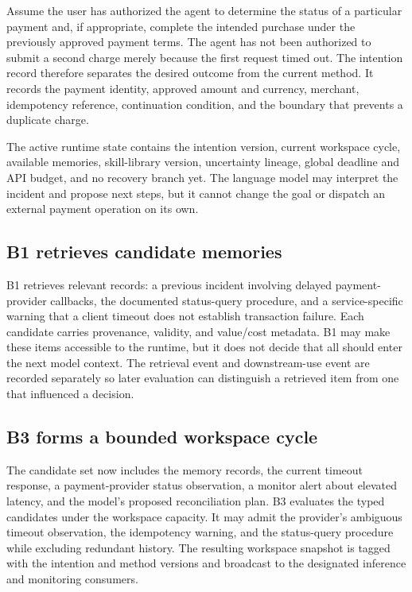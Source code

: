 Assume the user has authorized the agent to determine the status of a particular payment and, if appropriate, complete the intended purchase under the previously approved payment terms. The agent has not been authorized to submit a second charge merely because the first request timed out. The intention record therefore separates the desired outcome from the current method. It records the payment identity, approved amount and currency, merchant, idempotency reference, continuation condition, and the boundary that prevents a duplicate charge.

The active runtime state contains the intention version, current workspace cycle, available memories, skill-library version, uncertainty lineage, global deadline and API budget, and no recovery branch yet. The language model may interpret the incident and propose next steps, but it cannot change the goal or dispatch an external payment operation on its own.

\subsection{B1 retrieves candidate memories}
\label{subsec:ch18-productx-b1}

B1 retrieves relevant records: a previous incident involving delayed payment-provider callbacks, the documented status-query procedure, and a service-specific warning that a client timeout does not establish transaction failure. Each candidate carries provenance, validity, and value/cost metadata. B1 may make these items accessible to the runtime, but it does not decide that all should enter the next model context. The retrieval event and downstream-use event are recorded separately so later evaluation can distinguish a retrieved item from one that influenced a decision.

\subsection{B3 forms a bounded workspace cycle}
\label{subsec:ch18-productx-b3}

The candidate set now includes the memory records, the current timeout response, a payment-provider status observation, a monitor alert about elevated latency, and the model's proposed reconciliation plan. B3 evaluates the typed candidates under the workspace capacity. It may admit the provider's ambiguous timeout observation, the idempotency warning, and the status-query procedure while excluding redundant history. The resulting workspace snapshot is tagged with the intention and method versions and broadcast to the designated inference and monitoring consumers.

